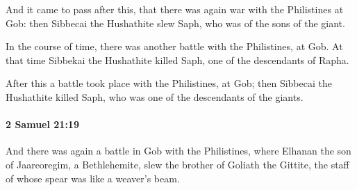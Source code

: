 			\begin{versebox}
					\item[BHS] 
					\item[ASV] And it came to pass after this, that there was again war with the Philistines at Gob: then Sibbecai the Hushathite slew Saph, who was of the sons of the giant.
					\item[NIV] In the course of time, there was another battle with the Philistines, at Gob. At that time Sibbekai the Hushathite killed Saph, one of the descendants of Rapha.
					\item[NRSV] After this a battle took place with the Philistines, at Gob; then Sibbecai the Hushathite killed Saph, who was one of the descendants of the giants.
			\end{versebox}

		\paragraph{2 Samuel 21:19} %
			\label{2SAMUEL-21-19}

			And there was again a battle in Gob with the Philistines, where Elhanan the son of Jaareoregim, a Bethlehemite, slew the brother of Goliath the Gittite, the staff of whose spear was like a weaver’s beam.

